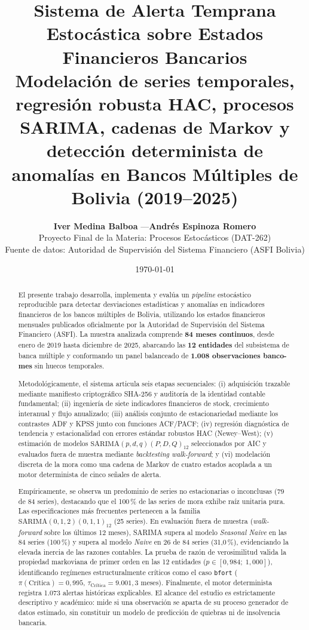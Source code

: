 \documentclass[11pt,letterpaper]{article}
\title{
  \vspace{-1.0cm}
  \textbf{\Large Sistema de Alerta Temprana Estocástica sobre Estados Financieros Bancarios}\\[0.45em]
  \large Modelación de series temporales, regresión robusta HAC, procesos SARIMA, cadenas de Markov y detección determinista de anomalías en Bancos Múltiples de Bolivia (2019--2025)
}
\author{
  \textbf{Iver Medina Balboa} \quad---\quad \textbf{Andrés Espinoza Romero}\\[0.25em]
  \small Proyecto Final de la Materia: Procesos Estocásticos (DAT-262)\\
  \small Fuente de datos: Autoridad de Supervisión del Sistema Financiero (ASFI Bolivia)
}
\date{\today}
\begin{document}
\sloppy

\maketitle
\thispagestyle{empty}

\begin{abstract}
El presente trabajo desarrolla, implementa y evalúa un \emph{pipeline} estocástico reproducible para detectar desviaciones estadísticas y anomalías en indicadores financieros de los bancos múltiples de Bolivia, utilizando los estados financieros mensuales publicados oficialmente por la Autoridad de Supervisión del Sistema Financiero (ASFI). La muestra analizada comprende \textbf{84 meses continuos}, desde enero de 2019 hasta diciembre de 2025, abarcando las \textbf{12 entidades} del subsistema de banca múltiple y conformando un panel balanceado de \textbf{1.008 observaciones banco-mes} sin huecos temporales.

Metodológicamente, el sistema articula seis etapas secuenciales: (i) adquisición trazable mediante manifiesto criptográfico SHA-256 y auditoría de la identidad contable fundamental; (ii) ingeniería de siete indicadores financieros de stock, crecimiento interanual y flujo anualizado; (iii) análisis conjunto de estacionariedad mediante los contrastes ADF y KPSS junto con funciones ACF/PACF; (iv) regresión diagnóstica de tendencia y estacionalidad con errores estándar robustos HAC (Newey--West); (v) estimación de modelos \(\text{SARIMA}(p,d,q)(P,D,Q)_{12}\) seleccionados por AIC y evaluados fuera de muestra mediante \emph{backtesting walk-forward}; y (vi) modelación discreta de la mora como una cadena de Markov de cuatro estados acoplada a un motor determinista de cinco señales de alerta.

Empíricamente, se observa un predominio de series no estacionarias o inconclusas (79 de 84 series), destacando que el 100\,\% de las series de mora exhibe raíz unitaria pura. Las especificaciones más frecuentes pertenecen a la familia \(\text{SARIMA}(0,1,2)(0,1,1)_{12}\) (25 series). En evaluación fuera de muestra (\emph{walk-forward} sobre los últimos 12 meses), SARIMA supera al modelo \emph{Seasonal Naive} en las 84 series (100\,\%) y supera al modelo \emph{Naive} en 26 de 84 series (31{,}0\,\%), evidenciando la elevada inercia de las razones contables. La prueba de razón de verosimilitud valida la propiedad markoviana de primer orden en las 12 entidades (\(p \in [0{,}984;\; 1{,}000]\)), identificando regímenes estructuralmente críticos como el caso \texttt{bfort} (\(\pi(\text{Crítica}) = 0{,}995\), \(\tau_{\text{Crítica}} = 9.001{,}3\) meses). Finalmente, el motor determinista registra 1.073 alertas históricas explicables. El alcance del estudio es estrictamente descriptivo y académico: mide si una observación se aparta de su proceso generador de datos estimado, sin constituir un modelo de predicción de quiebras ni de insolvencia bancaria.
\end{abstract}
\end{document}
